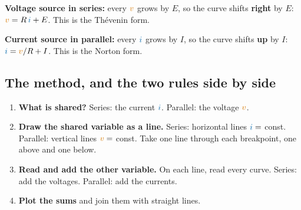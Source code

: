 \documentclass[11pt,a4paper]{article}
\newcommand{\Icol}[1]{\textcolor{ccur}{#1}}
\newcommand{\Vcol}[1]{\textcolor{cvolt}{#1}}
\newcommand{\pframe}[2]{%
  \draw[vax] (-1.3,0) -- (1.3,0) node[right=0pt, font=\tiny, text=cvolt] {$v$};
  \draw[vax] (0,-1.1) -- (0,1.15) node[above=0pt, font=\tiny, text=ccur] {$i$};
  \node[font=\scriptsize, text=metugray] at (0,-1.4) {#2};}
\newcommand{\threeplots}[7]{%
  \begin{scope}\pframe{0}{#5}#1\end{scope}
  \node[font=\large] at (2.05,0) {#4};
  \begin{scope}[xshift=4.1cm]\pframe{0}{#6}#2\end{scope}
  \node[font=\large] at (6.15,0) {$=$};
  \begin{scope}[xshift=8.2cm]\pframe{0}{#7}#3\end{scope}}
\newcommand{\minic}[3]{%
  \begin{scope}[shift={(#1-0.55,1.75)}, scale=\miniscale, transform shape]
    \draw (0,#2) node[ocirc] {}; \draw (0,0) node[ocirc] {};
    #3
  \end{scope}}
\newcommand{\mlab}[1]{{\Large #1}}
\newcommand{\miniscale}{0.62}
\newcommand{\mR}[4]{\draw (#1,#2) to[R, l=\mlab{#4}] (#1,#3);}
\newcommand{\mE}[4]{\draw (#1,#2) to[american voltage source, l=\mlab{\Vcol{#4}}] (#1,#3);}   %
\newcommand{\mI}[4]{\draw (#1,#2) to[american current source, l=\mlab{\Icol{#4}}] (#1,#3);}  %
\newcommand{\mW}[2]{\draw (0,#1) -- (#2,#1); \draw (0,0) -- (#2,0);}                             %
\newcommand{\miniR}[2]{\minic{#1}{2.2}{\mW{2.2}{0.8} \mR{0.8}{2.2}{0}{#2}}}
\newcommand{\miniE}[2]{\minic{#1}{2.2}{\mW{2.2}{0.8} \mE{0.8}{2.2}{0}{#2}}}
\newcommand{\miniI}[2]{\minic{#1}{2.2}{\mW{2.2}{0.8} \mI{0.8}{2.2}{0}{#2}}}
\newcommand{\miniRsE}[3]{\minic{#1}{3.6}{\mW{3.6}{0.8} \mR{0.8}{3.6}{1.8}{#2} \mE{0.8}{1.8}{0}{#3}}}
\newcommand{\miniRpI}[3]{\minic{#1}{2.2}{\mW{2.2}{2.3} \mR{0.8}{2.2}{0}{#2} \mI{2.3}{2.2}{0}{#3}}}
\begin{document}
\begin{center}
\end{center}
\textbf{Voltage source in series:} every $\Vcol{v}$ grows by $E$, so the curve shifts
\textbf{right} by $E$: $\Vcol{v} = R\,\Icol{i} + E$. This is the Th\'evenin form.

\begin{center}
\end{center}
\textbf{Current source in parallel:} every $\Icol{i}$ grows by $I$, so the curve shifts
\textbf{up} by $I$: $\Icol{i} = \Vcol{v}/R + I$. This is the Norton form.

\subsection{The method, and the two rules side by side}

\begin{ideabox}
\begin{enumerate}[itemsep=2pt]
  \item \textbf{What is shared?} Series: the current $\Icol{i}$. Parallel: the voltage $\Vcol{v}$.
  \item \textbf{Draw the shared variable as a line.} Series: horizontal lines $\Icol{i} = $ const.
        Parallel: vertical lines $\Vcol{v} = $ const. Take one line through each breakpoint, one
        above and one below.
  \item \textbf{Read and add the other variable.} On each line, read every curve. Series: add
        the voltages. Parallel: add the currents.
  \item \textbf{Plot the sums} and join them with straight lines.
\end{enumerate}
\end{ideabox}
\end{document}
